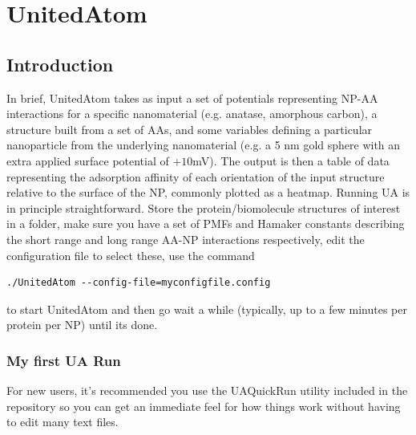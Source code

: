 \documentclass[10pt,a4paper,onecolumn]{report}
\begin{document}
 
\chapter{UnitedAtom}
 \section{Introduction}
 In brief, UnitedAtom takes as input a set of potentials representing NP-AA interactions for a specific nanomaterial (e.g. anatase, amorphous carbon), a structure built from a set of AAs, and some variables defining a particular nanoparticle from the underlying nanomaterial (e.g. a 5 nm gold sphere with an extra applied surface potential of $+10$mV). The output is then a table of data representing the adsorption affinity of each orientation of the input structure relative to the surface of the NP, commonly plotted as a heatmap.
  Running UA is in principle straightforward. Store the protein/biomolecule structures of interest in a folder, make sure you have a set of PMFs and Hamaker constants describing the short range and long range AA-NP interactions respectively, edit the configuration file to select these, use the command
\begin{lstlisting}
./UnitedAtom --config-file=myconfigfile.config
\end{lstlisting}
to start UnitedAtom and then go wait a while (typically, up to a few minutes per protein per NP) until its done. 


\subsection{My first UA Run}
For new users, it's recommended you use the UAQuickRun utility included in the repository so you can get an immediate feel for how things work without having to edit many text files. 
\end{document}
